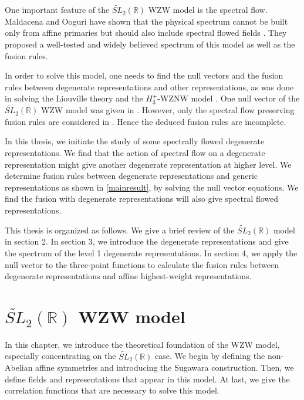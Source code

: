 \documentclass[10pt,a4paper]{article}
\numberwithin{equation}{section}
\begin{document}
One important feature of the $\widetilde{SL}_{2}(\mathbb{R})$ WZW model is the spectral flow. Maldacena and Ooguri have shown that the 
physical spectrum cannot be built only from affine primaries but should also include spectral flowed fields \cite{Maldacena:2001km}. 
They proposed a well-tested and widely believed spectrum of this model as well as the fusion rules.

In order to solve this model, one needs to find the null vectors and the fusion rules between degenerate representations and other 
representations, as was done in solving the Liouville theory \cite{Ribault:2014hia} and the $H^{+}_{3}$-WZNW model \cite{Teschner:1997ft}. 
One null vector of the $\widetilde{SL}_{2}(\mathbb{R})$ WZW model was given in \cite{Stocco:2022gah}. 
However, only the spectral flow preserving fusion rules are considered in \cite{Stocco:2022gah}. Hence the deduced 
fusion rules are incomplete. 

In this thesis, we initiate the study of some spectrally flowed degenerate representations. We find that the action of spectral flow on a 
degenerate representation might give another degenerate representation at higher level. We determine fusion rules between degenerate 
representations and generic representations as shown in \eqref{mainresult}, by solving the null vector equations. 
We find the fusion with degenerate representations will also give spectral flowed representations. 

This thesis is organized as follows. We give a brief review of the $\widetilde{SL}_{2}(\mathbb{R})$ model in section 2. In section 3, we 
introduce the degenerate representations and give the spectrum of the level 1 degenerate representations. In section 4, we apply the null 
vector to the three-point functions to calculate the fusion rules between degenerate representations and affine highest-weight representations.

\section{\texorpdfstring{$\widetilde{SL}_{2}(\mathbb{R})$}{Lg} WZW model}
In this chapter, we introduce the theoretical foundation of the WZW model, especially concentrating on the 
$\widetilde{SL}_{2}(\mathbb{R})$ case. We begin by defining the non-Abelian affine symmetries and introducing the Sugawara construction. 
Then, we define fields and representations that appear in this model. 
At last, we give the correlation functions that are necessary to solve this model. 
\end{document}

